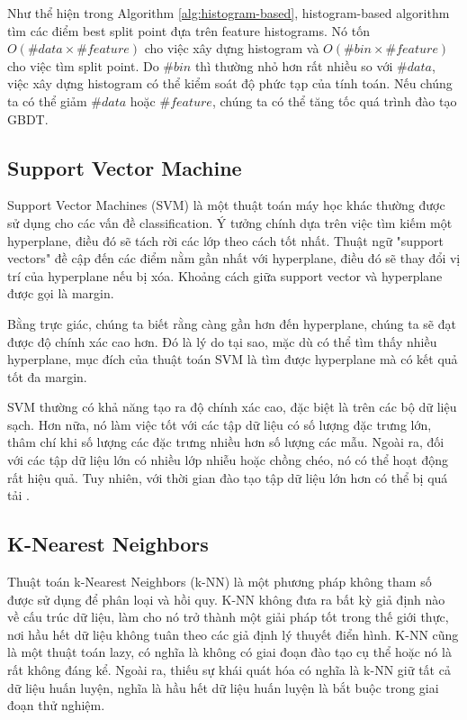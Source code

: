 Như thể hiện trong Algorithm \ref{alg:histogram-based}, histogram-based algorithm tìm các điểm best split point đựa trên feature histograms. 
Nó tốn $O(\#data \times \#feature)$ cho việc xây dựng histogram và $O(\#bin \times \#feature)$ cho việc tìm split point. Do $\#bin$ thì thường nhỏ hơn rất nhiều so với $\#data$, việc xây dựng histogram có thể kiểm soát độ phức tạp của tính toán. Nếu chúng ta có thể giảm $\#data$ hoặc $\#feature$, chúng ta có thể tăng tốc quá trình đào tạo GBDT.

\subsection{Support Vector Machine}

Support Vector Machines (SVM) là một thuật toán máy học khác thường được sử dụng cho các vấn đề classification.
Ý tưởng chính dựa trên việc tìm kiếm một hyperplane, điều đó sẽ tách rời các lớp theo cách tốt nhất.
Thuật ngữ "support vectors" đề cập đến các điểm nằm gần nhất với hyperplane, điều đó sẽ thay đổi vị trí của hyperplane nếu bị xóa.
Khoảng cách giữa support vector và hyperplane được gọi là margin.

Bằng trực giác, chúng ta biết rằng càng gần hơn đến hyperplane, chúng ta sẽ đạt được độ chính xác cao hơn. 
Đó là lý do tại sao, mặc dù có thể tìm thấy nhiều hyperplane, mục đích của thuật toán SVM là tìm được hyperplane mà có kết quả tốt đa margin.

SVM thường có khả năng tạo ra độ chính xác cao, đặc biệt là trên các bộ dữ liệu sạch.
Hơn nữa, nó làm việc tốt với các tập dữ liệu có số lượng đặc trưng lớn, thâm chí khi số lượng các đặc trưng nhiều hơn số lượng các mẫu.
Ngoài ra, đối với các tập dữ liệu lớn có nhiều lớp nhiễu hoặc chồng chéo, nó có thể hoạt động rất hiệu quả.
Tuy nhiên, với thời gian đào tạo tập dữ liệu lớn hơn có thể bị quá tải \cite{jing2010view}.

\subsection{K-Nearest Neighbors}

Thuật toán k-Nearest Neighbors (k-NN) là một phương pháp không tham số được sử dụng để phân loại và hồi quy.
K-NN không đưa ra bất kỳ giả định nào về cấu trúc dữ liệu, làm cho nó trở thành một giải pháp tốt trong thế giới thực, nơi hầu hết dữ liệu không tuân theo các giả định lý thuyết điển hình.
K-NN cũng là một thuật toán lazy, có nghĩa là không có giai đoạn đào tạo cụ thể hoặc nó là rất không đáng kể. 
Ngoài ra, thiếu sự khái quát hóa có nghĩa là k-NN giữ tất cả dữ liệu huấn luyện, nghĩa là hầu hết dữ liệu huấn luyện là bắt buộc trong giai đoạn thử nghiệm.

